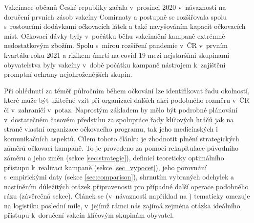 Vakcinace občanů České republiky začala v~prosinci 2020 v~návaznosti na doručení prvních zásob vakcíny Comirnaty a postupně se rozšiřovala spolu s~rostoucími do\-dáv\-ka\-mi očkovacích látek a také navyšováním kapacit očkovacích míst. %
%
Očkovací dávky byly v~počátku běhu vakcinační kampaně extrémně nedostatkovým zbožím. Spolu s~mírou rozšíření pandemie v~ČR v~prvním kvartálu roku 2021 a rizikem úmrtí na covid-19 mezi nejstaršími skupinami obyvatelstva byly vakcíny v~době počátku kampaně nástrojem k~zajištění promptní ochrany nejohroženějších skupin. %

Při ohlédnutí za téměř půlročním během očkování lze identifikovat řadu okolností, které může být užitečné vzít při organizaci dalších akcí podobného rozměru v~ČR či v~zahraničí v~potaz. Naprostým základem by mělo být podrobné plánování v~dostatečném časovém předstihu za spolupráce řady klíčových hráčů jak na straně vlastní organizace očkovacího programu, tak jeho medicínských i komunikačních aspektů. 
%
Cílem tohoto článku je zhodnotit plnění strategických záměrů očkovací kampaně. To je provedeno za pomoci rekapitulace původního záměru a jeho změn (sekce \ref{sec:strategie}), definicí teoreticky optimálního přístupu k~realizaci kampaně (sekce \ref{sec_vypocet}), jeho porovnání s~empirickými daty (sekce \ref{sec:comparison}), shrnutím vybraných odchylek a nastíněním důležitých otázek připravenosti pro případné další operace podobného rázu (zá\-vě\-reč\-ná sekce).
%
Článek se (v~návaznosti například na \cite{lastmile}) tematicky omezuje na logistiku poslední míle, v~jejímž rámci nás zajímá zejména otázka ideálního přístupu k~doručení vakcín klíčovým skupinám obyvatel.

